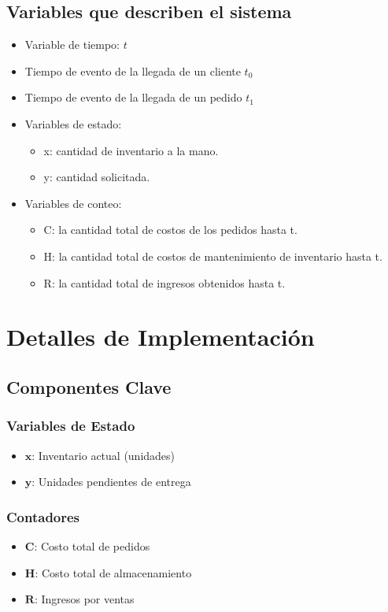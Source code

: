 \documentclass{article}
\begin{document}
\subsection{Variables que describen el sistema}
\begin{itemize}
    \item Variable de tiempo: $t$
    \item Tiempo de evento de la llegada de un cliente $t_0$
    \item Tiempo de evento de la llegada de un pedido $t_1$
    \item Variables de estado:
          \begin{itemize}
            \item x: cantidad de inventario a la mano.
            \item y: cantidad solicitada.
          \end{itemize}
    \item Variables de conteo:
          \begin{itemize}
            \item C: la cantidad total de costos de los pedidos hasta t.
            \item H: la cantidad total de costos de mantenimiento de inventario hasta t.
            \item R: la cantidad total de ingresos obtenidos hasta t.
          \end{itemize}

\end{itemize}

\section{Detalles de Implementación}

\subsection*{Componentes Clave}
\subsubsection*{Variables de Estado}
\begin{itemize}
    \item $\mathbf{x}$: Inventario actual (unidades)
    \item $\mathbf{y}$: Unidades pendientes de entrega
\end{itemize}

\subsubsection*{Contadores}
\begin{itemize}
    \item $\mathbf{C}$: Costo total de pedidos
    \item $\mathbf{H}$: Costo total de almacenamiento
    \item $\mathbf{R}$: Ingresos por ventas
\end{itemize}
\end{document}
